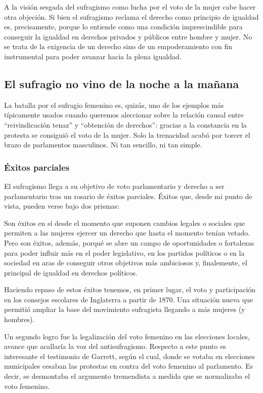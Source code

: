 \documentclass[
]{article}
\begin{document}
A la visión sesgada del sufragismo como lucha por el voto de la mujer
cabe hacer otra objeción. Si bien el sufragismo reclama el derecho como
principio de igualdad es, precisamente, porque lo entiende como una
condición imprescindible para conseguir la igualdad en derechos privados
y públicos entre hombre y mujer. No se trata de la exigencia de un
derecho sino de un empoderamiento con fin instrumental para poder
avanzar hacia la plena igualdad.

\hypertarget{el-sufragio-no-vino-de-la-noche-a-la-mauxf1ana}{%
\subsection{El sufragio no vino de la noche a la
mañana}\label{el-sufragio-no-vino-de-la-noche-a-la-mauxf1ana}}

La batalla por el sufragio femenino es, quizás, uno de los ejemplos más
típicamente usados cuando queremos aleccionar sobre la relación causal
entre ``reivindicación tenaz'' y ``obtención de derechos'': gracias a la
constancia en la protesta se consiguió el voto de la mujer. Solo la
trenacidad acabó por torcer el brazo de parlamentos masculinos. Ni tan
sencillo, ni tan simple.

\hypertarget{uxe9xitos-parciales}{%
\subsubsection{Éxitos parciales}\label{uxe9xitos-parciales}}

El sufragismo llega a su objetivo de voto parlamentario y derecho a ser
parlamentario tras un rosario de éxitos parciales. Éxitos que, desde mi
punto de vista, pueden verse bajo dos prismas:

Son éxitos en sí desde el momento que suponen cambios legales o sociales
que permiten a las mujeres ejercer un derecho que hasta el momento
tenían vetado. Pero son éxitos, además, porqué se abre un campo de
oportunidades o fortalezas para poder influir más en el poder
legislativo, en los partidos políticos o en la sociedad en aras de
conseguir otros objetivos más ambiciosos y, finalemente, el principal de
igualdad en derechos políticos.

Haciendo repaso de estos éxitos tenemos, en primer lugar, el voto y
participación en los consejos escolares de Inglaterra a partir de 1870.
Una situación nueva que permitió ampliar la base del movimiento
sufragista llegando a más mujeres (y hombres).

Un segundo logro fue la legalización del voto femenino en las elecciones
locales, avance que acallaría la voz del antisufragismo. Respecto a este
punto es interesante el testimonio de Garrett, según el cual, donde se
votaba en elecciones municipales cesaban las protestas en contra del
voto femenino al parlamento. Es decir, se desmontaba el argumento
tremendista a medida que se normalizaba el voto femenino.
\end{document}
